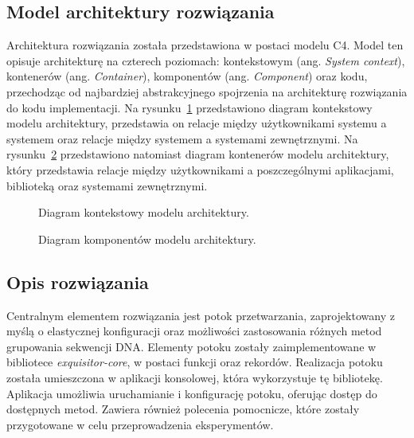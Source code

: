     \subsection{Model architektury rozwiązania}

        Architektura rozwiązania została przedstawiona w postaci modelu C4\cite{C4}. Model ten opisuje architekturę na czterech poziomach: kontekstowym (ang. \textit{System context}), kontenerów (ang. \textit{Container}), komponentów (ang. \textit{Component}) oraz kodu, przechodząc od najbardziej abstrakcyjnego spojrzenia na architekturę rozwiązania do kodu implementacji. Na rysunku~\ref{Picture:App:C4:Context} przedstawiono diagram kontekstowy modelu architektury, przedstawia on relacje między użytkownikami systemu a systemem oraz relacje między systemem a systemami zewnętrznymi. Na rysunku~\ref{Picture:App:C4:Container} przedstawiono natomiast diagram kontenerów modelu architektury, który przedstawia relacje między użytkownikami a poszczególnymi aplikacjami, biblioteką oraz systemami zewnętrznymi.

        \begin{figure}
            \begin{center}
                
            \end{center}
            \caption{
                Diagram kontekstowy modelu architektury.
            }\label{Picture:App:C4:Context}
        \end{figure}

        \begin{figure}
            \begin{center}
                
            \end{center}
            \caption{
                Diagram komponentów modelu architektury.
            }\label{Picture:App:C4:Container}
        \end{figure}

    \subsection{Opis rozwiązania}

        Centralnym elementem rozwiązania jest potok przetwarzania, zaprojektowany z myślą o elastycznej konfiguracji oraz możliwości zastosowania różnych metod grupowania sekwencji DNA. Elementy potoku zostały zaimplementowane w bibliotece \textit{exquisitor-core}, w postaci funkcji oraz rekordów. Realizacja potoku została umieszczona w aplikacji konsolowej, która wykorzystuje tę bibliotekę. Aplikacja umożliwia uruchamianie i konfigurację potoku, oferując dostęp do dostępnych metod. Zawiera również polecenia pomocnicze, które zostały przygotowane w celu przeprowadzenia eksperymentów.

